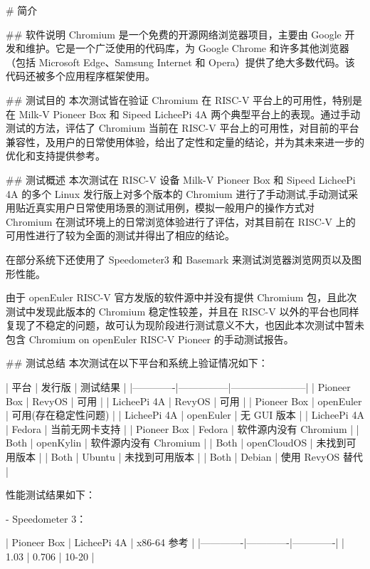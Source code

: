 \documentclass{article}
\begin{document}
\begin{markdown}

# 简介

## 软件说明
Chromium 是一个免费的开源网络浏览器项目，主要由 Google 开发和维护。它是一个广泛使用的代码库，为 Google Chrome 和许多其他浏览器（包括 Microsoft Edge、Samsung Internet 和 Opera）提供了绝大多数代码。该代码还被多个应用程序框架使用。

## 测试目的
本次测试皆在验证 Chromium 在 RISC-V 平台上的可用性，特别是在 Milk-V Pioneer Box 和 Sipeed LicheePi 4A 两个典型平台上的表现。通过手动测试的方法，评估了 Chromium 当前在 RISC-V 平台上的可用性，对目前的平台兼容性，及用户的日常使用体验，给出了定性和定量的结论，并为其未来进一步的优化和支持提供参考。

## 测试概述
本次测试在 RISC-V 设备 Milk-V Pioneer Box 和 Sipeed LicheePi 4A 的多个 Linux 发行版上对多个版本的 Chromium 进行了手动测试,手动测试采用贴近真实用户日常使用场景的测试用例，模拟一般用户的操作方式对 Chromium 在测试环境上的日常浏览体验进行了评估，对其目前在 RISC-V 上的可用性进行了较为全面的测试并得出了相应的结论。

在部分系统下还使用了 Speedometer3 和 Basemark 来测试浏览器浏览网页以及图形性能。

由于 openEuler RISC-V 官方发版的软件源中并没有提供 Chromium 包，且此次测试中发现此版本的 Chromium 稳定性较差，并且在 RISC-V 以外的平台也同样复现了不稳定的问题，故可认为现阶段进行测试意义不大，也因此本次测试中暂未包含 Chromium on openEuler RISC-V Pioneer 的手动测试报告。

## 测试总结
本次测试在以下平台和系统上验证情况如下：

| 平台        | 发行版        | 测试结果              |
|-------------|---------------|-----------------------|
| Pioneer Box | RevyOS        | 可用                  |
| LicheePi 4A | RevyOS        | 可用                  |
| Pioneer Box | openEuler     | 可用(存在稳定性问题)   |
| LicheePi 4A | openEuler     | 无 GUI 版本           |
| LicheePi 4A | Fedora        | 当前无网卡支持        |
| Pioneer Box | Fedora        | 软件源内没有 Chromium |
| Both        | openKylin     | 软件源内没有 Chromium |
| Both        | openCloudOS   | 未找到可用版本        |
| Both        | Ubuntu        | 未找到可用版本        |
| Both        | Debian | 使用 RevyOS 替代      |


性能测试结果如下：

- Speedometer 3：

| Pioneer Box | LicheePi 4A | x86-64 参考 |
|-------------|-------------|-------------|
|    1.03     | 0.706       | 10-20       |


\end{markdown}
\end{document}
